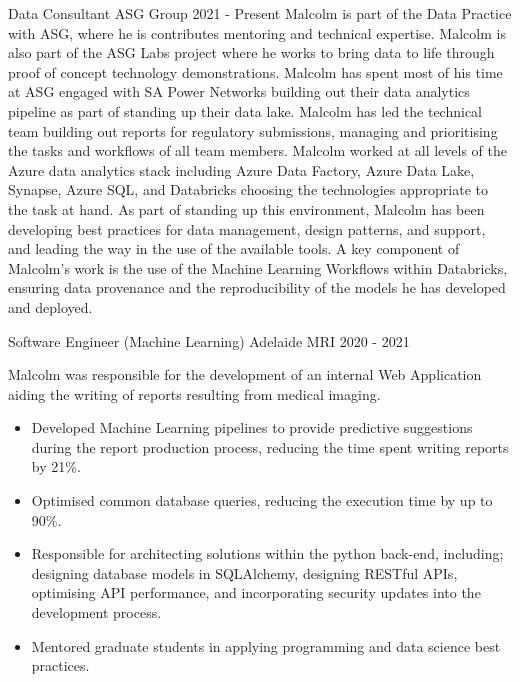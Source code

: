 
\begin{cventries}

\cventry
  {Data Consultant} %
  {ASG Group} %
  {} %
  {2021 - Present} %
{%
  Malcolm is part of the Data Practice with ASG,
  where he is contributes mentoring and technical expertise.
  Malcolm is also part of the ASG Labs project
  where he works to bring data to life through
  proof of concept technology demonstrations. \newline
  Malcolm has spent most of his time at ASG engaged with SA Power Networks
  building out their data analytics pipeline
  as part of standing up their data lake.
  Malcolm has led the technical team
  building out reports for regulatory submissions,
  managing and prioritising the
  tasks and workflows of all team members.
  Malcolm worked at all levels of the Azure data analytics stack
  including Azure Data Factory, Azure Data Lake, Synapse, Azure SQL, and Databricks
  choosing the technologies appropriate to the task at hand.
  As part of standing up this environment,
  Malcolm has been developing best practices
  for data management, design patterns, and support,
  and leading the way in the use of the available tools. \newline
  A key component of Malcolm's work is the use of
  the Machine Learning Workflows within Databricks,
  ensuring data provenance and the reproducibility of the models
  he has developed and deployed.
}

\cventry
  {Software Engineer (Machine Learning)} %
  {Adelaide MRI} %
  {} %
  {2020 - 2021} %
{%
  Malcolm was responsible for the development of an internal Web Application
  aiding the writing of reports resulting from medical imaging.
  \begin{itemize}
    \item Developed Machine Learning pipelines to provide predictive
      suggestions during the report production process, reducing the time spent
      writing reports by 21\%.
    \item Optimised common database queries, reducing the execution time by
      up to 90\%.
    \item Responsible for architecting solutions
      within the python back-end, including;
      designing database models in SQLAlchemy,
      designing RESTful APIs,
      optimising API performance,
      and incorporating security updates into the development process.
    \item Mentored graduate students in applying programming and data science
      best practices.
  \end{itemize}
}


\end{cventries}
